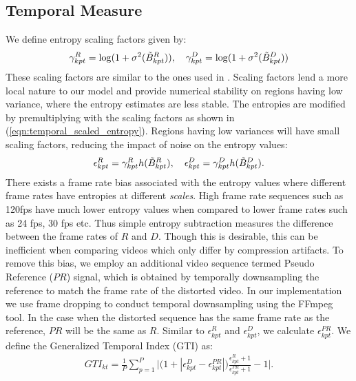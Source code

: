 \documentclass[journal]{IEEEtran}
\begin{document}
\subsection{Temporal Measure}
We define entropy scaling factors given by:
\begin{align*}
    \gamma_{kpt} ^R = \log(1+\sigma^2(\Tilde{B}_{kpt}^R)), \quad \gamma_{kpt}^D = \log(1+\sigma^2(\Tilde{B}_{kpt}^D))
\end{align*}
These scaling factors are similar to the ones used in \cite{soundararajan2012rred,soundararajan2012video}. Scaling factors lend a more local nature to our model and provide numerical stability on regions having low variance, where the entropy estimates are less stable. The entropies are modified by premultiplying with the scaling factors as shown in (\ref{eqn:temporal_scaled_entropy}). Regions having low variances will have small scaling factors, reducing the impact of noise on the entropy values:
\begin{align}
    \epsilon_{kpt} ^R = \gamma_{kpt} ^R h(\Tilde{B}_{kpt}^R), \quad \epsilon_{kpt} ^D = \gamma_{kpt} ^D h(\Tilde{B}_{kpt}^D).
    \label{eqn:temporal_scaled_entropy}
\end{align}
There exists a frame rate bias associated with the entropy values where different frame rates have entropies at different \textit{scales}. High frame rate sequences such as 120fps have much lower entropy values when compared to lower frame rates such as 24 fps, 30 fps etc. Thus simple entropy subtraction measures the difference between the frame rates of $R$ and $D$. Though this is desirable, this can be inefficient when comparing videos which only differ by compression artifacts. To remove this bias, we employ an additional video sequence termed Pseudo Reference ($PR$) signal, which is obtained by temporally downsampling the reference to match the frame rate of the distorted video. In our implementation we use frame dropping to conduct temporal downsampling using the FFmpeg \cite{ffmpeg} tool. In the case when the distorted sequence has the same frame rate as the reference, $PR$ will be the same as $R$. Similar to $\epsilon_{kpt}^R$ and $\epsilon_{kpt}^D$, we calculate $\epsilon_{kpt} ^{PR}$. We define the Generalized Temporal Index (GTI) as:
\begin{align}
    GTI_{kt} = \frac{1}{P}\sum_{p=1} ^P \Bigg|\Big(1 + |\epsilon_{kpt} ^D - \epsilon_{kpt} ^{PR}|\Big) \frac{\epsilon_{kpt} ^R + 1}{\epsilon_{kpt} ^{PR} + 1} - 1 \Bigg|.
    \label{eqn:GTI}
\end{align}
\end{document}
